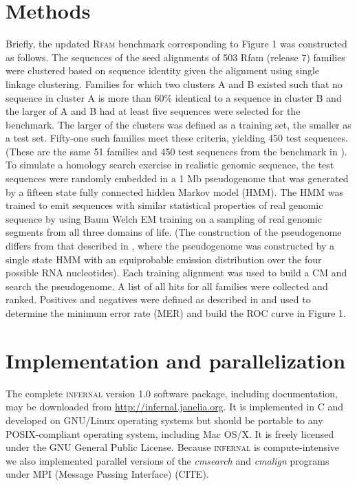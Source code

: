 \documentclass[11pt]{article}
\begin{document}
\section{Methods}
Briefly, the updated \textsc{Rfam} benchmark corresponding to Figure 1
was constructed as follows. The sequences of the seed alignments of
503 Rfam (release 7) families were clustered based on sequence
identity given the alignment using single linkage clustering. Families
for which two clusters A and B existed such that no sequence in
cluster A is more than 60\% identical to a sequence in cluster B and
the larger of A and B had at least five sequences were selected for
the benchmark. The larger of the clusters was defined as a training
set, the smaller as a test set. Fifty-one such families meet these
criteria, yielding 450 test sequences. (These are the same 51 families
and 450 test sequences from the benchmark in
\cite{NawrockiEddy07}). To simulate a homology search exercise in
realistic genomic sequence, the test sequences were randomly embedded
in a 1 Mb pseudogenome that was generated by a fifteen state fully
connected hidden Markov model (HMM). The HMM was trained to emit
sequences with similar statistical properties of real genomic sequence
by using Baum Welch EM training \cite{Durbin98} on a sampling of real
genomic segments from all three domains of life.
(The construction of the pseudogenome differs from that described in
\cite{NawrockiEddy07}, where the pseudogenome was constructed by a
single state HMM with an equiprobable emission distribution over the
four possible RNA nucleotides). Each training alignment was used to
build a CM and search the pseudogenome. A list of all hits for all
families were collected and ranked. Positives and negatives were
defined as described in \cite{NawrockiEddy07} and used to determine
the minimum error rate (MER) \cite{Pearson95} and build the ROC curve
in Figure 1.

\section{Implementation and parallelization}
The complete \textsc{infernal} version 1.0 software package, including
documentation, may be downloaded from
\url{http://infernal.janelia.org}. It is implemented in C and
developed on GNU/Linux operating systems but should be portable to any
POSIX-compliant operating system, including Mac OS/X. It is freely
licensed under the GNU General Public License. Because
\textsc{infernal} is compute-intensive we also implemented parallel
versions of the \emph{cmsearch} and \emph{cmalign} programs under MPI
(Message Passing Interface) (CITE).
\end{document}
